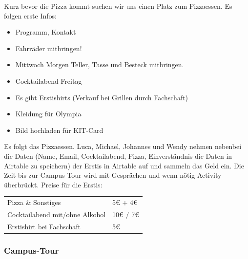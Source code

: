 \documentclass[10pt,ngerman]{scrartcl}
\providecommand{\tabularnewline}{\\}
\begin{document}
\begin{multicols}{2}
Kurz bevor die Pizza kommt suchen wir uns einen Platz zum Pizzaessen.
Es folgen erste Infos:
\begin{itemize}
    \item Programm, Kontakt
    \item Fahrräder mitbringen!
    \item Mittwoch Morgen Teller, Tasse und Besteck mitbringen.
    \item Cocktailabend Freitag
    \item Es gibt Erstishirts (Verkauf bei Grillen durch Fachschaft)
    \item Kleidung für Olympia
    \item Bild hochladen für KIT-Card
\end{itemize}
Es folgt das Pizzaessen. Luca, Michael, Johannes und Wendy nehmen
nebenbei die Daten (Name, Email, Cocktailabend, Pizza, Einverständnis
die Daten in Airtable zu speichern) der Erstis in Airtable auf und
sammeln das Geld ein. Die Zeit bis zur Campus-Tour wird mit Gesprächen
und wenn nötig Activity überbrückt. Preise für die Erstis:

\medskip{}

\begin{tabular}{ll}
    Pizza \& Sonstiges             & 5€ + 4€\tabularnewline
    Cocktailabend mit/ohne Alkohol & 10€ / 7€\tabularnewline
    Erstishirt bei Fachschaft      & 5€\tabularnewline
\end{tabular}


\subsubsection{Campus-Tour}



\end{multicols}
\end{document}

